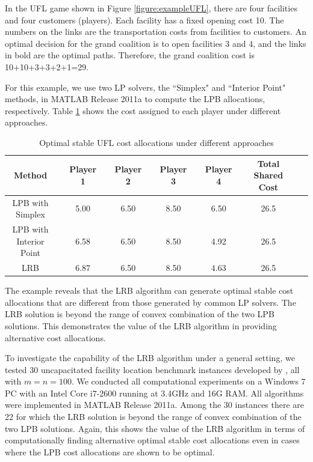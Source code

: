 \documentclass[ijoc,nonblindrev]{informs3} %
\begin{document}
In the UFL game shown in Figure \ref{figure:exampleUFL}, there are four facilities and four customers (players). Each facility has a fixed opening cost 10. The numbers on the links are the transportation costs from facilities to customers. An optimal decision for the grand coalition is to open facilities 3 and 4, and the links in bold are the optimal paths. Therefore, the grand coalition cost is 10+10+3+3+2+1=29.

For this example, we use two LP solvers, the ``Simplex" and ``Interior Point" methods, in MATLAB Release 2011a to compute the LPB allocations, respectively.
Table \ref{table:UFLCA} shows the cost assigned to each player under different approaches.

\begin{table}[H]
\vspace{-2mm}
\centering
\tabcolsep=4pt
\small
\renewcommand\arraystretch{1.5}
\caption{\label{table:UFLCA} Optimal stable UFL cost allocations under different approaches}
\begin{tabular}[!h]{c c c c c c c c c c c c c}
\hline
\multicolumn{1}{c}{Method} &\multicolumn{1}{c}{} &\multicolumn{1}{c}{Player 1} &\multicolumn{1}{c}{} &\multicolumn{1}{c}{Player 2} &\multicolumn{1}{c}{} &\multicolumn{1}{c}{Player 3} &\multicolumn{1}{c}{} &\multicolumn{1}{c}{Player 4}	&\multicolumn{1}{c}{} &\multicolumn{1}{c}{Total Shared Cost}\\
\hline
LPB with Simplex	& &5.00	& &6.50	& &8.50	& &6.50	&	&26.5	&\\
LPB with Interior Point	& &6.58	& &6.50	& &8.50	& &4.92	&	&26.5	&\\
LRB	& &6.87	& &6.50	& &8.50	& &4.63	&	&26.5	&\\
\hline
\end{tabular}
\vspace{-3mm}
\end{table}


The example reveals that the LRB algorithm can generate optimal stable cost allocations that are different from those generated by common LP solvers.
The LRB solution is beyond the range of convex combination of the two LPB solutions. 
This demonstrates the value of the LRB algorithm in providing alternative cost allocations.


To investigate the capability of the LRB algorithm under a general setting, we tested 30 uncapacitated facility location benchmark instances developed by \cite{Benchmark}, all with $m=n=100$. We conducted all computational experiments  on a Windows 7 PC with an Intel Core i7-2600 running at 3.4GHz and 16G RAM. All algorithms were implemented in MATLAB Release 2011a.
Among the 30 instances there are 22 for which the LRB solution is  beyond the range of convex combination of the two LPB solutions. 
Again, this shows the value of the LRB algorithm in terms of computationally finding alternative optimal stable cost allocations even in cases where the LPB cost allocations are shown to be optimal.
\end{document}

